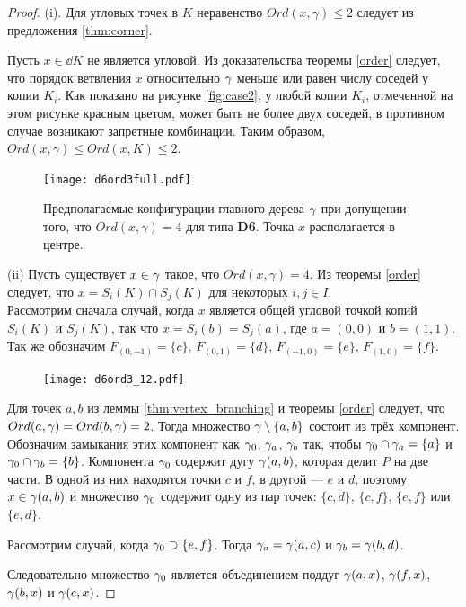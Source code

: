 \begin{proof}
(i). Для угловых точек в $K$ неравенство $Ord(x,\gamma)\leq2$ следует из предложения \ref{thm:corner}.

Пусть $x\in\dd K$ не является угловой.
Из доказательства теоремы \ref{order} следует, что порядок ветвления $x$ относительно $\gamma$ меньше или равен числу соседей у копии $K_i$. 
Как показано на рисунке \ref{fig:case2}, у любой копии $K_i$, отмеченной на этом рисунке красным цветом, может быть не более двух соседей, в противном случае возникают запретные комбинации. 
Таким образом, $Ord(x,\gamma)\leq Ord(x,K)\leq2$.
\begin{figure}[H]
    \centering
    \texttt{[image: d6ord3full.pdf]}
    \caption{Предполагаемые конфигурации главного дерева $\gamma$ при допущении того, что $Ord(x,\gamma)=4$ для типа {\bf D6}. Точка $x$ располагается в центре.}
    \label{fig:d6ord3full}
\end{figure}

(ii)  Пусть существует $x\in\gamma$ такое, что $Ord(x,\gamma)=4.$
Из теоремы \ref{order} следует, что  $x=S_i(K)\cap S_j(K)$ для некоторых $i,j\in I$.\\
Рассмотрим сначала случай, когда $x$ является общей угловой точкой копий  $S_i(K)$ и $S_j(K)$, так что $x=S_i(b)=S_j(a)$, где $a=(0,0)$ и $b=(1,1)$. 
Так же обозначим $F_{(0,-1)}=\{c\}$, $F_{(0,1)}=\{d\}$, $F_{(-1,0)}=\{e\}$, $F_{(1,0)}=\{f\}$.

\begin{figure}[H]
    \centering \texttt{[image: d6ord3\_12.pdf]}
\end{figure}

Для точек $a,b$ из леммы \ref{thm:vertex_branching} и теоремы \ref{order} следует, что $Ord(a,\gamma)=Ord(b,\gamma)=2$. 
Тогда множество $\gamma\setminus\{a,b\}$ состоит из трёх компонент. 
Обозначим замыкания этих компонент как $\gamma_0$, $\gamma_a$, $\gamma_b$ так, чтобы $\gamma_0\cap\gamma_a=\{a\}$ и $\gamma_0\cap \gamma_b=\{b\}$. 
Компонента $\gamma_0$ содержит дугу $\gamma(a,b)$, которая делит $P$ на две части. 
В одной из них находятся точки $c$ и $f$, в другой --- $e$ и $d$, поэтому $x\in \gamma(a,b)$ и множество $\gamma_0$ содержит одну из пар точек: $\{c,d\}$, $\{c,f\}$, $\{e,f\}$ или $\{e,d\}$.

Рассмотрим случай, когда $\gamma_0\supset\{e,f\}$. 
Тогда $\gamma_a=\gamma(a,c)$ и $\gamma_b=\gamma(b,d)$.

Следовательно множество $\gamma_0$ является объединением поддуг $\gamma(a,x)$, $\gamma(f,x)$, $\gamma(b,x)$ и $\gamma(e,x)$.


\end{proof}
